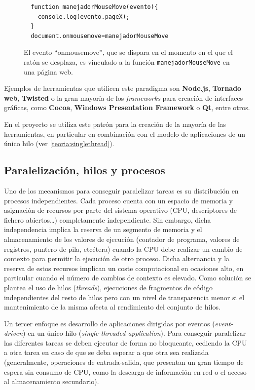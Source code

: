 \begin{figure}[H]
\centering
  \begin{lstlisting}
  function manejadorMouseMove(evento){
    console.log(evento.pageX);
  }
  document.onmousemove=manejadorMouseMove
  \end{lstlisting}
\caption[Evento y manejador]{El evento ``onmousemove'', que se dispara en el momento en el que el ratón se desplaza, es vinculado a la función \texttt{manejadorMouseMove} en una página web.}
\end{figure}

Ejemplos de herramientas que utilicen este paradigma son \textbf{Node.js}, \textbf{Tornado web}, \textbf{Twisted} o la gran mayoría de los \textit{frameworks} para creación de interfaces gráficas, como \textbf{Cocoa}, \textbf{Windows Presentation Framework} o \textbf{Qt}, entre otros.

En el proyecto se utiliza este patrón para la creación de la mayoría de las herramientas, en particular en combinación con el modelo de aplicaciones de un único hilo (ver \ref{teoria:singlethread}).

\subsection{Paralelización, hilos y procesos}

Uno de los mecanismos para conseguir paralelizar tareas es su distribución en procesos independientes. Cada proceso cuenta con un espacio de memoria y asignación de recursos por parte del sistema operativo (CPU, descriptores de fichero abiertos\dots) completamente independiente. Sin embargo, dicha independencia implica la reserva de un segmento de memoria y el almacenamiento de los valores de ejecución (contador de programa, valores de registros, puntero de pila, etcétera) cuando la CPU debe realizar un cambio de contexto para permitir la ejecución de otro proceso. Dicha alternancia y la reserva de estos recursos implican un coste computacional en ocasiones alto, en particular cuando el número de cambios de contexto es elevado. Como solución se plantea el uso de hilos (\textit{threads}), ejecuciones de fragmentos de código independientes del resto de hilos pero con un nivel de transparencia menor si el mantenimiento de la misma afecta al rendimiento del conjunto de hilos.

\label{teoria:singlethread}
Un tercer enfoque es desarrollo de aplicaciones dirigidas por eventos (\textit{event-driven}) en un único hilo (\textit{single-threaded application}). Para conseguir paralelizar las diferentes tareas se deben ejecutar de forma no bloqueante, cediendo la CPU a otra tarea en caso de que se deba esperar a que otra sea realizada (generalmente, operaciones de entrada-salida, que presentan un gran tiempo de espera sin consumo de CPU, como la descarga de información en red o el acceso al almacenamiento secundario).

